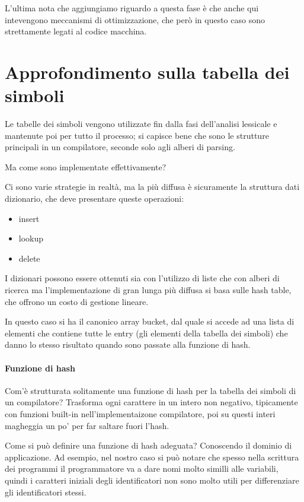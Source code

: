 \documentclass[class=book, crop=false, oneside, 12pt]{standalone}
\begin{document}
L'ultima nota che aggiungiamo riguardo a questa fase è che anche qui intevengono meccanismi di ottimizzazione, che però in questo caso sono strettamente legati al codice macchina.

\section{Approfondimento sulla tabella dei simboli}
Le tabelle dei simboli vengono utilizzate fin dalla fasi dell'analisi lessicale e mantenute poi per tutto il processo; si capisce bene che sono le strutture principali in un compilatore, seconde solo agli alberi di parsing.

Ma come sono implementate effettivamente? 

Ci sono varie strategie in realtà, ma la più diffusa è sicuramente la struttura dati dizionario, che deve presentare queste operazioni:
\begin{itemize}
    \item insert
    \item lookup
    \item delete
\end{itemize}
I dizionari possono essere ottenuti sia con l'utilizzo di liste che con alberi di ricerca ma l'implementazione di gran lunga più diffusa si basa sulle hash table, che offrono un costo di gestione lineare.

In questo caso si ha il canonico array bucket, dal quale si accede ad una lista di elementi che contiene tutte le entry (gli elementi della tabella dei simboli) che danno lo stesso risultato quando sono passate alla funzione di hash.

\paragraph{Funzione di hash} Com'è strutturata solitamente una funzione di hash per la tabella dei simboli di un compilatore?
Trasforma ogni carattere in un intero non negativo, tipicamente con funzioni built-in nell'implementaizone compilatore, poi su questi interi magheggia un po' per far saltare fuori l'hash.

Come si può definire una funzione di hash adeguata?
Conoscendo il dominio di applicazione. Ad esempio, nel nostro caso si può notare che spesso nella scrittura dei programmi il programmatore va a dare nomi molto similli alle variabili, quindi i caratteri iniziali degli identificatori non sono molto utili per differenziare gli identificatori stessi.
\end{document}
